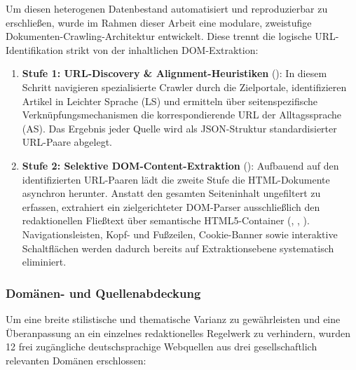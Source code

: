 Um diesen heterogenen Datenbestand automatisiert und reproduzierbar zu erschließen, wurde im Rahmen dieser Arbeit eine modulare, zweistufige Dokumenten-Crawling-Architektur entwickelt. Diese trennt die logische URL-Identifikation strikt von der inhaltlichen DOM-Extraktion:

\begin{enumerate}
    \item \textbf{Stufe 1: URL-Discovery \& Alignment-Heuristiken} (): In diesem Schritt navigieren spezialisierte Crawler durch die Zielportale, identifizieren Artikel in Leichter Sprache (LS) und ermitteln über seitenspezifische Verknüpfungsmechanismen die korrespondierende URL der Alltagssprache (AS). Das Ergebnis jeder Quelle wird als JSON-Struktur standardisierter URL-Paare abgelegt.
    \item \textbf{Stufe 2: Selektive DOM-Content-Extraktion} (): Aufbauend auf den identifizierten URL-Paaren lädt die zweite Stufe die HTML-Dokumente asynchron herunter. Anstatt den gesamten Seiteninhalt ungefiltert zu erfassen, extrahiert ein zielgerichteter DOM-Parser ausschließlich den redaktionellen Fließtext über semantische HTML5-Container (, , ). Navigationsleisten, Kopf- und Fußzeilen, Cookie-Banner sowie interaktive Schaltflächen werden dadurch bereits auf Extraktionsebene systematisch eliminiert.
\end{enumerate}

\subsubsection{Domänen- und Quellenabdeckung}
Um eine breite stilistische und thematische Varianz zu gewährleisten und eine Überanpassung an ein einzelnes redaktionelles Regelwerk zu verhindern, wurden 12 frei zugängliche deutschsprachige Webquellen aus drei gesellschaftlich relevanten Domänen erschlossen:

